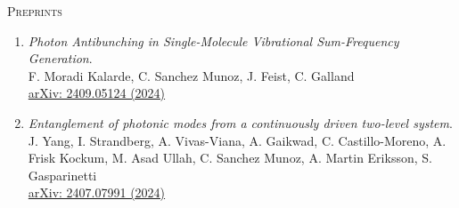 \begin{center}
\textsc{Preprints}
\end{center}
\begin{enumerate}
 \item \emph{Photon Antibunching in Single-Molecule Vibrational Sum-Frequency Generation}.\\ 
{F. Moradi Kalarde, C. Sanchez Munoz, J. Feist, C. Galland}\\ 
  \href{https://ui.adsabs.harvard.edu/abs/2024arXiv240905124M/abstract}{{arXiv:  2409.05124 (2024)}}

 \item \emph{Entanglement of photonic modes from a continuously driven two-level system}.\\ 
{J. Yang, I. Strandberg, A. Vivas-Viana, A. Gaikwad, C. Castillo-Moreno, A. Frisk Kockum, M. Asad Ullah, C. Sanchez Munoz, A. Martin Eriksson, S. Gasparinetti}\\ 
  \href{https://arxiv.org/abs/2407.07991}{{arXiv: 2407.07991 (2024)}}

\end{enumerate}
